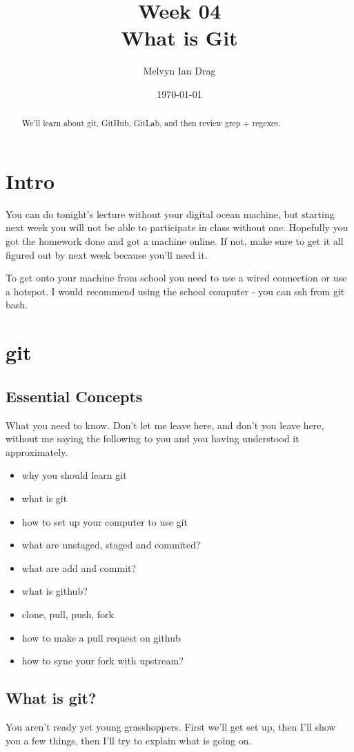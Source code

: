 \documentclass[10pt]{article}
\title{\textbf{Week 04} \\
What is Git
}
\author{
	Melvyn Ian Drag
}
\date{\today}
\begin{document}
\maketitle

\begin{abstract}
We'll learn about git, GitHub, GitLab, and then review grep + regexes.
\end{abstract}

\section{Intro}
You can do tonight's lecture without your digital ocean machine, but starting next week
you will not be able to participate in class without one. Hopefully you got the
homework done and got a machine online. If not, make sure to get it all figured
out by next week because you'll need it.

To get onto your machine from school you need to use a wired connection or use a
hotspot. I would recommend using the school computer - you can ssh from git bash.

\section{git}
\subsection{Essential Concepts}
What you need to know. Don't let me leave here, and don't you leave here,
without me saying the following to you and you having understood it
approximately.

\begin{itemize}
\item why you should learn git
\item what is git
\item how to set up your computer to use git
\item what are unstaged, staged and commited?
\item what are add and commit?
\item what is github?
\item clone, pull, push, fork
\item how to make a pull request on github
\item how to sync your fork with upstream?
\end{itemize}


\subsection{What is git?}
You aren't ready yet young grasshoppers. First we'll get set up, then I'll show
you a few things, then I'll try to explain what is going on.
\end{document}
